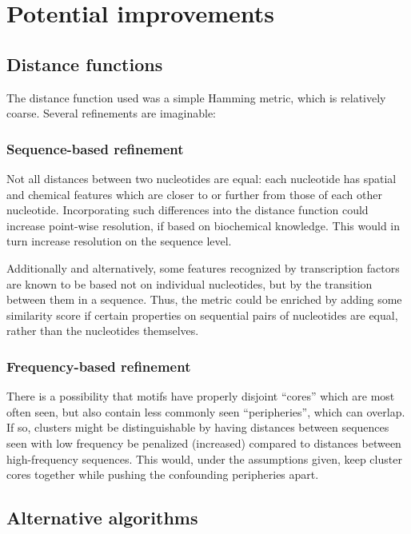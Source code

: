 \documentclass[fleqn]{book}
\begin{document}
\section{Potential improvements}\label{potential-improvements}

\subsection{Distance functions}\label{distance-functions}

The distance function used was a simple Hamming metric, which is
relatively coarse. Several refinements are imaginable:

\subsubsection{Sequence-based
refinement}\label{sequence-based-refinement}

Not all distances between two nucleotides are equal: each nucleotide has
spatial and chemical features which are closer to or further from those
of each other nucleotide. Incorporating such differences into the
distance function could increase point-wise resolution, if based on
biochemical knowledge. This would in turn increase resolution on the
sequence level.

Additionally and alternatively, some features recognized by
transcription factors are known to be based not on individual
nucleotides, but by the transition between them in a sequence. Thus, the
metric could be enriched by adding some similarity score if certain
properties on sequential pairs of nucleotides are equal, rather than the
nucleotides themselves.

\subsubsection{Frequency-based
refinement}\label{frequency-based-refinement}

There is a possibility that motifs have properly disjoint ``cores''
which are most often seen, but also contain less commonly seen
``peripheries'', which can overlap. If so, clusters might be
distinguishable by having distances between sequences seen with low
frequency be penalized (increased) compared to distances between
high-frequency sequences. This would, under the assumptions given, keep
cluster cores together while pushing the confounding peripheries apart.

\subsection{Alternative algorithms}\label{alternative-algorithms}
\end{document}
